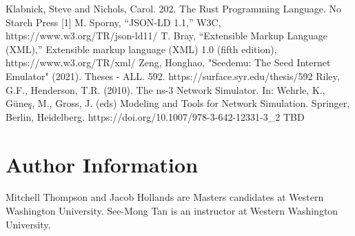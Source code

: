 \documentclass[journal]{IEEEtran} %
\begin{document}
\begin{thebibliography}{00}
     Klabnick, Steve and Nichols, Carol. 202. The Rust Programming Language. No Starch Press
     [1] M. Sporny, “JSON-LD 1.1,” W3C, https://www.w3.org/TR/json-ld11/
     T. Bray, “Extensible Markup Language (XML),” Extensible markup language (XML) 1.0 (fifth edition), https://www.w3.org/TR/xml/ 
     Zeng, Honghao, "Seedemu: The Seed Internet Emulator" (2021). Theses - ALL. 592. https://surface.syr.edu/thesis/592
     Riley, G.F., Henderson, T.R. (2010). The ns-3 Network Simulator. In: Wehrle, K., Güneş, M., Gross, J. (eds) Modeling and Tools for Network Simulation. Springer, Berlin, Heidelberg. https://doi.org/10.1007/978-3-642-12331-3\_2
     TBD



\end{thebibliography}



\section{Author Information}
Mitchell Thompson and Jacob Hollands are Masters candidates at Western Washington University. See-Mong Tan is an instructor at Western Washington University.
\end{document}
